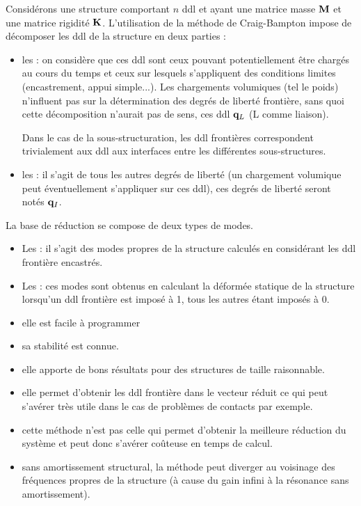 Considérons une structure comportant $n$ ddl et ayant une matrice masse $\MM{M}$ et une matrice rigidité $\MM{K}$.
L'utilisation de la méthode de Craig-Bampton
impose de décomposer les ddl de la structure en deux parties :
\begin{itemize}
   \item les : on considère que ces ddl sont ceux pouvant potentiellement être chargés au cours du temps
	et ceux sur lesquels s'appliquent des conditions limites (encastrement, appui simple...). Les chargements volumiques
	(tel le poids) n'influent pas sur la détermination des degrés de liberté frontière, sans quoi cette décomposition n'aurait
	pas de sens, ces ddl $\VV{q}_L$ (L comme liaison).

	Dans le cas de la sous-structuration, les ddl frontières correspondent trivialement aux ddl aux interfaces entre
	les différentes sous-structures.
   \item les : il s'agit de tous les autres degrés de liberté (un chargement volumique peut éventuellement
	s'appliquer sur ces ddl), ces degrés de liberté seront notés $\VV{q}_I$.
\end{itemize}
\medskipvm
La base de réduction se compose de deux types de modes.
\begin{itemize}
   \item Les : il s'agit des modes propres de la structure calculés en considérant les ddl frontière encastrés.
   \item Les : ces modes sont obtenus en calculant la déformée statique de la structure lorsqu'un ddl frontière
	est imposé à 1, tous les autres étant imposés à 0.
\end{itemize}
\medskipvm
{}
\begin{itemize}
   \item elle est facile à programmer
   \item sa stabilité est connue.
   \item elle apporte de bons résultats pour des structures de taille raisonnable.
   \item elle permet d'obtenir les ddl frontière dans le vecteur réduit ce qui peut s'avérer très utile dans le cas de problèmes de contacts
	par exemple.
\end{itemize}
\medskipvm
{}
\begin{itemize}
   \item cette méthode n'est pas celle qui permet d'obtenir la meilleure réduction du système et peut donc s'avérer coûteuse en temps de calcul.
   \item sans amortissement structural, la méthode peut diverger au voisinage des fréquences propres de la structure (à cause du gain infini à
	la résonance sans amortissement).
\end{itemize}


